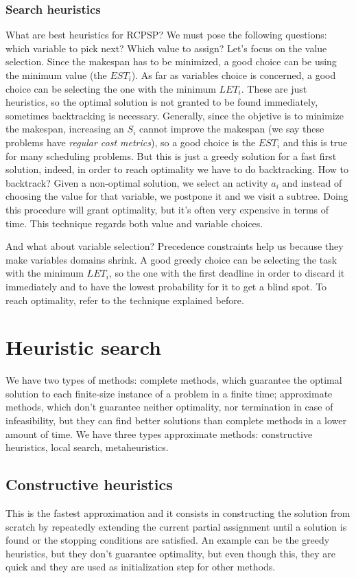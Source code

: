 \documentclass[10pt,a4paper]{article}
\begin{document}
\subsubsection{Search heuristics}
What are best heuristics for RCPSP? We must pose the following questions:
which variable to pick next? Which value to assign? Let's focus on the value
selection. Since the makespan has to be minimized, a good choice can be using
the minimum value (the $EST_i$). As far as variables choice is concerned, a good
choice can be selecting the one with the minimum $LET_i$. These are just
heuristics, so the optimal solution is not granted to be found immediately,
sometimes backtracking is necessary. Generally, since the objetive is to
minimize the makespan, increasing an $S_i$ cannot improve the makespan (we say
these problems have \textit{regular cost metrics}), so a good choice is the
$EST_i$ and this is true for many scheduling problems. But this is just a greedy
solution for a fast first solution, indeed, in order to reach optimality we have
to do backtracking. How to backtrack? Given a non-optimal solution, we select an
activity $a_i$ and instead of choosing the value for that variable, we postpone
it and we visit a subtree. Doing this procedure will grant optimality, but it's
often very expensive in terms of time. This technique regards both value and
variable choices.

And what about variable selection? Precedence constraints help us because they
make variables domains shrink. A good greedy choice can be selecting the task
with the minimum $LET_i$, so the one with the first deadline in order to discard
it immediately and to have the lowest probability for it to get a blind spot. To
reach optimality, refer to the technique explained before.

\section{Heuristic search}
We have two types of methods: complete methods, which guarantee the optimal
solution to each finite-size instance of a problem in a finite time; approximate
methods, which don't guarantee neither optimality, nor termination in case of
infeasibility, but they can find better solutions than complete methods in a
lower amount of time. We have three types approximate methods: constructive
heuristics, local search, metaheuristics.

\subsection{Constructive heuristics}
This is the fastest approximation and it consists in constructing the solution
from scratch by repeatedly extending the current partial assignment until a
solution is found or the stopping conditions are satisfied. An example can be
the greedy heuristics, but they don't guarantee optimality, but even though
this, they are quick and they are used as initialization step for other methods.
\end{document}
